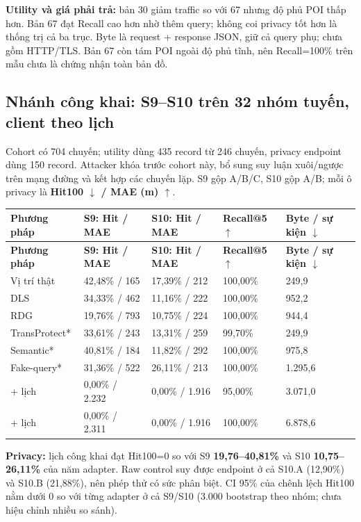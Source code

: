 \documentclass[10pt,a4paper]{article}
\begin{document}
\textbf{Utility và giá phải trả:} bản 30 giảm traffic so với 67 nhưng độ phủ POI thấp hơn. Bản 67 đạt Recall cao hơn nhờ thêm query; không coi privacy tốt hơn là thống trị cả ba trục. Byte là request + response JSON, giữ cả query phụ; chưa gồm HTTP/TLS. Bản 67 còn tám POI ngoài độ phủ tĩnh, nên Recall=100\% trên mẫu chưa là chứng nhận toàn bản đồ.


\clearpage
\subsection{Nhánh công khai: S9–S10 trên 32 nhóm tuyến, client theo lịch}\label{sub:3.2}
Cohort có 704 chuyến; utility dùng 435 record từ 246 chuyến, privacy endpoint dùng 150 record. Attacker khóa trước cohort này, bổ sung suy luận xuôi/ngược trên mạng đường và kết hợp các chuyến lặp. S9 gộp A/B/C, S10 gộp A/B; mỗi ô privacy là \textbf{Hit100 $\downarrow$ / MAE (m) $\uparrow$}.

\begingroup\small
\begin{longtable}{@{}P{3.177cm}P{3.658cm}P{3.658cm}P{2.695cm}P{2.888cm}@{}}
\toprule
\textbf{Phương pháp} & \textbf{S9: Hit / MAE} & \textbf{S10: Hit / MAE} & \textbf{Recall@5 $\uparrow$} & \textbf{Byte / sự kiện $\downarrow$}\\\midrule
\endfirsthead
\toprule
\textbf{Phương pháp} & \textbf{S9: Hit / MAE} & \textbf{S10: Hit / MAE} & \textbf{Recall@5 $\uparrow$} & \textbf{Byte / sự kiện $\downarrow$}\\\midrule
\endhead
\bottomrule\endfoot
Vị trí thật & 42,48\% / 165 & 17,39\% / 212 & 100,00\% & 249,9\\
\addlinespace[3pt]
DLS & 34,33\% / 462 & 11,16\% / 222 & 100,00\% & 952,2\\
\addlinespace[3pt]
RDG & 19,76\% / 793 & 10,75\% / 224 & 100,00\% & 944,4\\
\addlinespace[3pt]
TransProtect* & 33,61\% / 243 & 13,31\% / 259 & 99,70\% & 249,9\\
\addlinespace[3pt]
Semantic* & 40,81\% / 184 & 11,82\% / 292 & 100,00\% & 975,8\\
\addlinespace[3pt]
Fake-query* & 31,36\% / 522 & 26,11\% / 213 & 100,00\% & 1.295,6\\
 + lịch & 0,00\% / 2.232 & 0,00\% / 1.916 & 95,00\% & 3.071,0\\
 + lịch & 0,00\% / 2.311 & 0,00\% / 1.916 & 100,00\% & 6.878,6\\
\end{longtable}
\endgroup
\textbf{Privacy:} lịch công khai đạt Hit100=0 so với S9 \textbf{19,76–40,81\%} và S10 \textbf{10,75–26,11\%} của năm adapter. Raw control suy được endpoint ở cả S10.A (12,90\%) và S10.B (21,88\%), nên phép thử có sức phân biệt. CI 95\% của chênh lệch Hit100 nằm dưới 0 so với từng adapter ở cả S9/S10 (3.000 bootstrap theo nhóm; chưa hiệu chỉnh nhiều so sánh).
\end{document}
